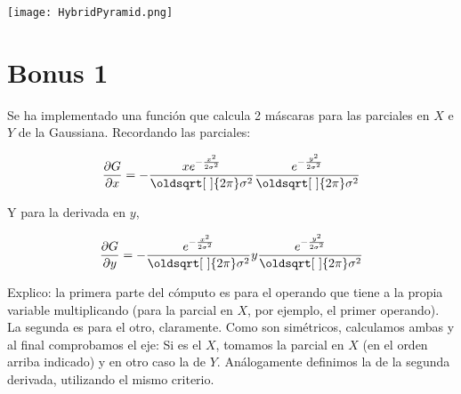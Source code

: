 \documentclass[a4paper, 11pt]{article}
\theoremstyle{definition}
\renewcommand*{\sqrt}[2][\ ]{\oldsqrt[#1]{#2} }
\begin{document}
  \centerline{\texttt{[image: HybridPyramid.png]}}

  \section{Bonus 1}

  Se ha implementado una función que calcula 2 máscaras para las parciales en $X$ e $Y$
  de la Gaussiana. Recordando las parciales:

  \[
   \frac{\partial G}{\partial x} = - \frac{x e^{- \frac{x^{2}}{2 \sigma^{2}}}}{\sqrt{2 \pi} \sigma^{2}} \frac{e^{- \frac{y^{2}}{2 \sigma^{2}}}}{\sqrt{2 \pi} \sigma^{2}}
  \]

  Y para la derivada en $y$,

  \[
   \frac{\partial G}{\partial y} = - \frac{e^{- \frac{x^{2}}{2 \sigma^{2}}}}{\sqrt{2 \pi} \sigma^{2}} y\frac{e^{- \frac{y^{2}}{2 \sigma^{2}}}}{\sqrt{2 \pi} \sigma^{2}}
  \]

  Explico: la primera parte del cómputo es para el operando que tiene a la propia
  variable multiplicando (para la parcial en $X$, por ejemplo, el primer operando).
  La segunda es para el otro, claramente. Como son simétricos, calculamos ambas
  y al final comprobamos el eje: Si es el $X$, tomamos la parcial en $X$ (en el orden
  arriba indicado) y en otro caso la de $Y$. Análogamente definimos la de la segunda
  derivada, utilizando el mismo criterio.
\end{document}
